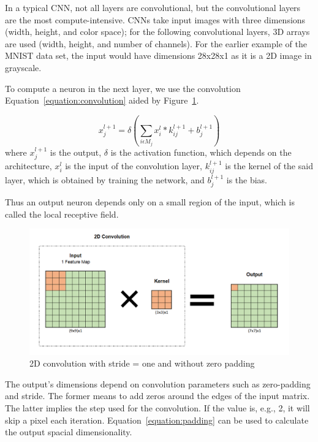 In a typical CNN, not all layers are convolutional, but the convolutional layers
are the most compute-intensive. CNNs take input images with three  dimensions
(width, height, and color space); for the following convolutional layers, 3D
arrays are used (width, height, and number of channels). For the earlier example
of the MNIST data set, the input would have dimensions 28x28x1 as it is a 2D
image in grayscale.

To compute a neuron in the next layer, we use the convolution
Equation~\ref{equation:convolution} aided by Figure~\ref{Cl}.

\begin{equation} \label{equation:convolution}
    \displaystyle x_{j}^{l+1}=\delta (\sum_{i \epsilon M_{j}}x_{i}^{l} * k_{ij}^{l+1}+ b_{j}^{l+1})
\end{equation}
where $x_{j}^{l+1}$ is the output, $\delta$ is the activation function, which
depends on the architecture, $x_{i}^{l}$ is the input of the convolution layer,
$k_{ij}^{l+1}$ is the kernel of the said layer, which is obtained by training the
network, and $b_{j}^{l+1}$ is the bias.

Thus an output neuron depends only on a small region of the input, which is
called the local receptive field.

\begin{figure}[!htbp]
    \centering
    \includegraphics[width=1\textwidth]{Figures/conv.png}
    \caption{2D convolution with stride = one and without zero padding}
    \label{Cl}
\end{figure} 

The output's dimensions depend on convolution parameters such as
zero-padding and stride. The former means to add zeros around the edges of the
input matrix. The latter implies the step used for the convolution. If the value
is, e.g., 2, it will skip a pixel each iteration.
Equation~\ref{equation:padding} can be used to calculate the output spacial dimensionality\cite{cnnequation}.

